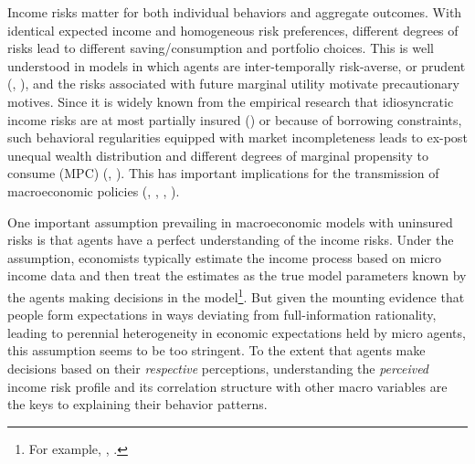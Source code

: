 \documentclass[12pt,notitlepage,onecolumn,aps,pra]{article}
\begin{document}
Income risks matter for both individual behaviors and aggregate
outcomes. With identical expected income and homogeneous risk
preferences, different degrees of risks lead to different
saving/consumption and portfolio choices. This is well understood in
models in which agents are inter-temporally risk-averse, or prudent
(\cite{kimball1990precautionary}, \cite{carroll2001liquidity}), and the
risks associated with future marginal utility motivate precautionary
motives. Since it is widely known from the empirical research that
idiosyncratic income risks are at most partially insured
(\cite{blundell_consumption_2008}) or because of borrowing constraints,
such behavioral regularities equipped with market incompleteness leads
to ex-post unequal wealth distribution and different degrees of marginal
propensity to consume (MPC) (\cite{huggett1993risk},
\cite{aiyagari1994uninsured}). This has important implications for the
transmission of macroeconomic policies
(\cite{krueger2016macroeconomics}, \cite{kaplan2018monetary},
\cite{auclert2019monetary}, \cite{bayer2019precautionary}).

One important assumption prevailing in macroeconomic models with
uninsured risks is that agents have a perfect understanding of the
income risks. Under the assumption, economists typically estimate the
income process based on micro income data and then treat the estimates
as the true model parameters known by the agents making decisions in the
model\footnote{For example, \cite{krueger2016macroeconomics}, \cite{bayer2019precautionary}.}.
But given the mounting evidence that people form expectations in ways
deviating from full-information rationality, leading to perennial
heterogeneity in economic expectations held by micro agents, this
assumption seems to be too stringent. To the extent that agents make
decisions based on their \emph{respective} perceptions, understanding
the \emph{perceived} income risk profile and its correlation structure
with other macro variables are the keys to explaining their behavior
patterns.
\end{document}
